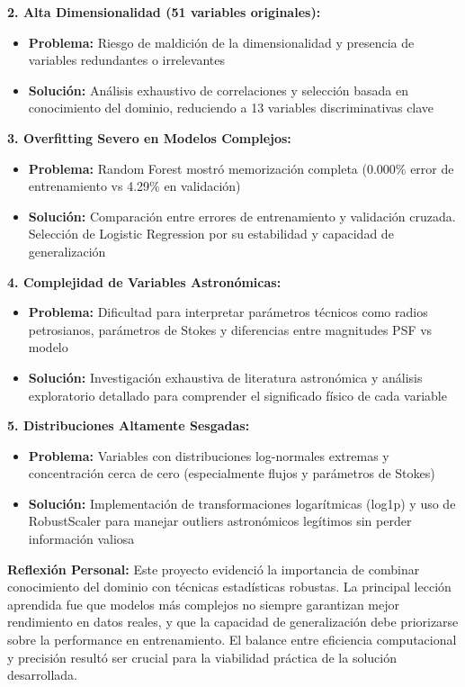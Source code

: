 \documentclass{article}
\begin{document}
\textbf{2. Alta Dimensionalidad (51 variables originales):}
\begin{itemize}
    \item \textbf{Problema:} Riesgo de maldición de la dimensionalidad y presencia de variables redundantes o irrelevantes
    \item \textbf{Solución:} Análisis exhaustivo de correlaciones y selección basada en conocimiento del dominio, reduciendo a 13 variables discriminativas clave
\end{itemize}

\textbf{3. Overfitting Severo en Modelos Complejos:}
\begin{itemize}
    \item \textbf{Problema:} Random Forest mostró memorización completa (0.000\% error de entrenamiento vs 4.29\% en validación)
    \item \textbf{Solución:} Comparación entre errores de entrenamiento y validación cruzada. Selección de Logistic Regression por su estabilidad y capacidad de generalización
\end{itemize}

\textbf{4. Complejidad de Variables Astronómicas:}
\begin{itemize}
    \item \textbf{Problema:} Dificultad para interpretar parámetros técnicos como radios petrosianos, parámetros de Stokes y diferencias entre magnitudes PSF vs modelo
    \item \textbf{Solución:} Investigación exhaustiva de literatura astronómica y análisis exploratorio detallado para comprender el significado físico de cada variable
\end{itemize}

\textbf{5. Distribuciones Altamente Sesgadas:}
\begin{itemize}
    \item \textbf{Problema:} Variables con distribuciones log-normales extremas y concentración cerca de cero (especialmente flujos y parámetros de Stokes)
    \item \textbf{Solución:} Implementación de transformaciones logarítmicas (log1p) y uso de RobustScaler para manejar outliers astronómicos legítimos sin perder información valiosa
\end{itemize}

\textbf{Reflexión Personal:}
Este proyecto evidenció la importancia de combinar conocimiento del dominio con técnicas estadísticas robustas. La principal lección aprendida fue que modelos más complejos no siempre garantizan mejor rendimiento en datos reales, y que la capacidad de generalización debe priorizarse sobre la performance en entrenamiento. El balance entre eficiencia computacional y precisión resultó ser crucial para la viabilidad práctica de la solución desarrollada.
\end{document}
